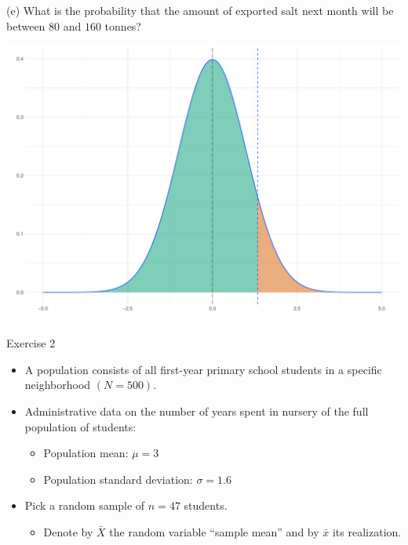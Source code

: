 \documentclass[
  11pt,
  ignorenonframetext,
]{beamer}
\providecommand{\tightlist}{%
  \setlength{\itemsep}{0pt}\setlength{\parskip}{0pt}}
\begin{document}
\begin{frame}{(e) What is the probability that the amount of exported
salt next month will be between \(80\) and \(160\) tonnes?}
\protect\hypertarget{e-what-is-the-probability-that-the-amount-of-exported-salt-next-month-will-be-between-80-and-160-tonnes-2}{}
\begin{center}\includegraphics[width=0.8\linewidth]{ECON1013_Tutorial2_files/figure-beamer/unnamed-chunk-7-1} \end{center}
\end{frame}

\begin{frame}{Exercise 2}
\protect\hypertarget{exercise-2}{}
\begin{itemize}
\item
  A population consists of all first-year primary school students in a
  specific neighborhood \((N = 500)\).
\item
  Administrative data on the number of years spent in nursery of the
  full population of students:

  \begin{itemize}
  \tightlist
  \item
    Population mean: \(\mu = 3\)
  \item
    Population standard deviation: \(\sigma = 1.6\)
  \end{itemize}
\item
  Pick a random sample of \(n = 47\) students.

  \begin{itemize}
  \tightlist
  \item
    Denote by \(\bar{X}\) the random variable ``sample mean'' and by
    \(\bar{x}\) its realization.
  \end{itemize}
\end{itemize}
\end{frame}
\end{document}
